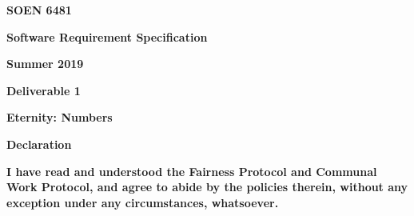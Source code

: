 \documentclass[12pt]{article}
\begin{document}
\vspace{\baselineskip}
\begin{Center}
{\fontsize{16pt}{19.2pt}\selectfont \textbf{SOEN 6481}\par}
\end{Center}\par


\vspace{\baselineskip}
\begin{Center}
{\fontsize{16pt}{19.2pt}\selectfont \textbf{Software Requirement Specification}\par}
\end{Center}\par


\vspace{\baselineskip}
\begin{Center}
{\fontsize{16pt}{19.2pt}\selectfont \textbf{Summer 2019}\par}
\end{Center}\par


\vspace{\baselineskip}
\begin{Center}
{\fontsize{16pt}{19.2pt}\selectfont \textbf{Deliverable 1}\par}
\end{Center}\par


\vspace{\baselineskip}
\begin{Center}
{\fontsize{16pt}{19.2pt}\selectfont \textbf{Eternity: Numbers}\par}
\end{Center}\par


\vspace{\baselineskip}
\begin{Center}
{\fontsize{16pt}{19.2pt}\selectfont \textbf{Declaration}\par}
\end{Center}\par


\vspace{\baselineskip}
\begin{justify}
{\fontsize{16pt}{19.2pt}\selectfont \textbf{I have read and understood the Fairness Protocol and Communal Work Protocol, and agree to abide by the policies therein, without any exception under any circumstances, whatsoever.}\par}
\end{justify}\par
\end{document}
